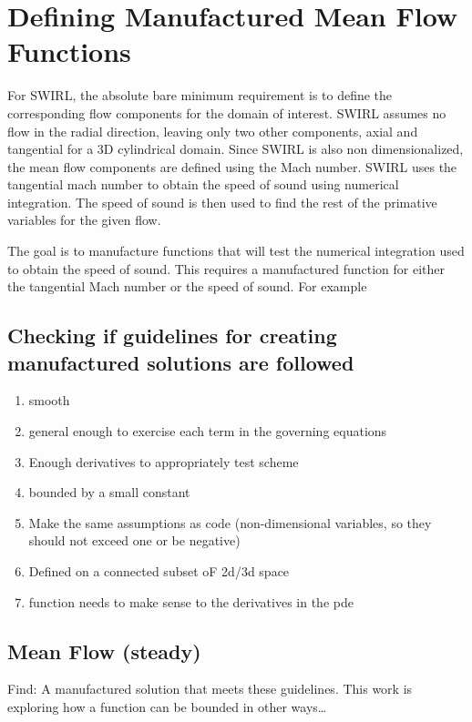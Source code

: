 \documentclass[a4paper]{article}
\begin{document}
\section{Defining Manufactured Mean Flow Functions}

For SWIRL, the absolute bare minimum requirement is to define the corresponding
flow components for the domain of interest. SWIRL assumes no flow in the radial 
direction, leaving only two other components, axial and tangential for a 3D 
cylindrical domain. Since SWIRL is also non dimensionalized, the mean flow 
components are defined using the Mach number. SWIRL uses the tangential mach number
to obtain the speed of sound using numerical integration. The speed of sound
is then used to find the rest of the primative variables for the given flow. 

The goal is to manufacture functions that will test the numerical integration used 
to obtain the speed of sound. 
This requires a manufactured function for either
the tangential Mach number or the speed of sound. For example
\subsection{Checking if guidelines for creating manufactured solutions are followed}

\begin{enumerate}
    \item smooth
    \item general enough to exercise each term in the governing equations
    \item Enough derivatives to appropriately test scheme
    \item bounded by a small constant
    \item Make the same assumptions as code (non-dimensional variables, so they
        should not exceed one or be negative)
    \item Defined on a connected subset oF 2d/3d space
    \item function needs to make sense to the derivatives in the pde
\end{enumerate}

\subsection{Mean Flow (steady)}

Find: A manufactured solution that meets these guidelines. This work is exploring
how a function can be bounded  in other ways\ldots
\end{document}
